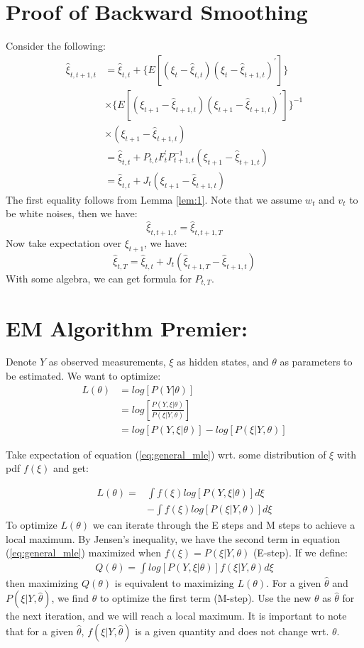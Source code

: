 \documentclass[12pt]{article}
\numberwithin{equation}{section}
\begin{document}
\section{Proof of Backward Smoothing} \label{ap:smooth}
Consider the following:
\begin{align*}
    \hat{\xi}_{t,t+1,t} &= \hat{\xi}_{t,t} + \{E[(\xi_t-\hat{\xi}_{t,t})(\xi_t-\hat{\xi}_{t+1,t})^{'}]\} \\
    & \times \{E[(\xi_{t+1}-\hat{\xi}_{t+1,t})(\xi_{t+1}-\hat{\xi}_{t+1,t})^{'}]\}^{-1} \\
    & \times (\xi_{t+1} - \hat{\xi}_{t+1,t}) \\
    &= \hat{\xi}_{t,t} + P_{t,t}F_t^{'}P_{t+1,t}^{-1}(\xi_{t+1}-\hat{\xi}_{t+1,t}) \\
    &= \hat{\xi}_{t,t} + J_t(\xi_{t+1}-\hat{\xi}_{t+1,t})
\end{align*}
The first equality follows from Lemma \ref{lem:1}. Note that we assume $w_t$ and $v_t$ to be white noises, then we have:
\[
    \hat{\xi}_{t,t+1,t} = \hat{\xi}_{t,t+1,T}
\]
Now take expectation over $\xi_{t+1}$, we have:
\[
    \hat{\xi}_{t,T} = \hat{\xi}_{t,t} + J_t(\hat{\xi}_{t+1,T}-\hat{\xi}_{t+1,t})
\]
With some algebra, we can get formula for $P_{t,T}$.

\section{EM Algorithm Premier:} \label{ap:EM_proof}
Denote $Y$ as observed measurements, $\xi$ as hidden states, and $\theta$ as parameters to be estimated. We want to optimize:
\begin{align}
    L(\theta) & = log[P(Y|\theta)] \nonumber \\
    & = log\left[\frac{P(Y,\xi|\theta)}{P(\xi|Y,\theta)}\right] \nonumber \\
    & = log[P(Y,\xi|\theta)] - log[P(\xi|Y,\theta)] \label{eq:general_mle}
\end{align}

Take expectation of equation (\ref{eq:general_mle}) wrt. some distribution of $\xi$ with pdf $f(\xi)$ and get:

\begin{align}
    L(\theta) = & \int f(\xi)log[P(Y,\xi|\theta)]d\xi \nonumber \\
    & - \int f(\xi)log[P(\xi|Y,\theta)]d\xi \nonumber
\end{align}
To optimize $L(\theta)$ we can iterate through the E steps and M steps to achieve a local maximum. By Jensen's inequality, we have the second term in equation (\ref{eq:general_mle}) maximized when $f(\xi)=P(\xi|Y,\theta)$ (E-step). If we define:
\begin{align}
    Q(\theta) = \int log[P(Y,\xi|\theta)]f(\xi|Y,\theta)d\xi \label{eq:Q}
\end{align}
then maximizing $Q(\theta)$ is equivalent to maximizing $ L(\theta)$. For a given $\hat{\theta}$ and $P(\xi|Y, \hat{\theta})$, we find $\theta$ to optimize the first term (M-step). Use the new $\theta$ as $\hat{\theta}$ for the next iteration, and we will reach a local maximum. It is important to note that for a given $\hat{\theta}$, $f(\xi|Y, \hat{\theta})$ is a given quantity and does not change wrt. $\theta$. 
\end{document}
